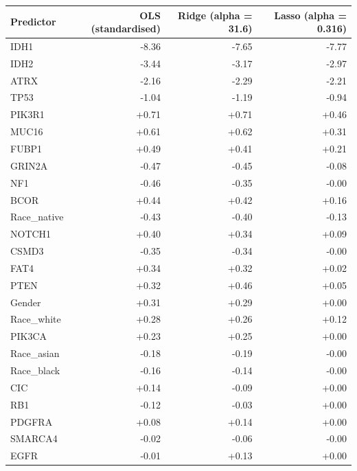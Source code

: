 \begin{tabular}{lrrr}
\toprule
\textbf{Predictor} & \textbf{OLS (standardised)} & \textbf{Ridge (alpha = 31.6)} & \textbf{Lasso (alpha = 0.316)} \\
\midrule
IDH1 & -8.36 & -7.65 & -7.77 \\
IDH2 & -3.44 & -3.17 & -2.97 \\
ATRX & -2.16 & -2.29 & -2.21 \\
TP53 & -1.04 & -1.19 & -0.94 \\
PIK3R1 & +0.71 & +0.71 & +0.46 \\
MUC16 & +0.61 & +0.62 & +0.31 \\
FUBP1 & +0.49 & +0.41 & +0.21 \\
GRIN2A & -0.47 & -0.45 & -0.08 \\
NF1 & -0.46 & -0.35 & -0.00 \\
BCOR & +0.44 & +0.42 & +0.16 \\
Race\_native & -0.43 & -0.40 & -0.13 \\
NOTCH1 & +0.40 & +0.34 & +0.09 \\
CSMD3 & -0.35 & -0.34 & -0.00 \\
FAT4 & +0.34 & +0.32 & +0.02 \\
PTEN & +0.32 & +0.46 & +0.05 \\
Gender & +0.31 & +0.29 & +0.00 \\
Race\_white & +0.28 & +0.26 & +0.12 \\
PIK3CA & +0.23 & +0.25 & +0.00 \\
Race\_asian & -0.18 & -0.19 & -0.00 \\
Race\_black & -0.16 & -0.14 & -0.00 \\
CIC & +0.14 & -0.09 & +0.00 \\
RB1 & -0.12 & -0.03 & +0.00 \\
PDGFRA & +0.08 & +0.14 & +0.00 \\
SMARCA4 & -0.02 & -0.06 & -0.00 \\
EGFR & -0.01 & +0.13 & +0.00 \\
\bottomrule
\end{tabular}
